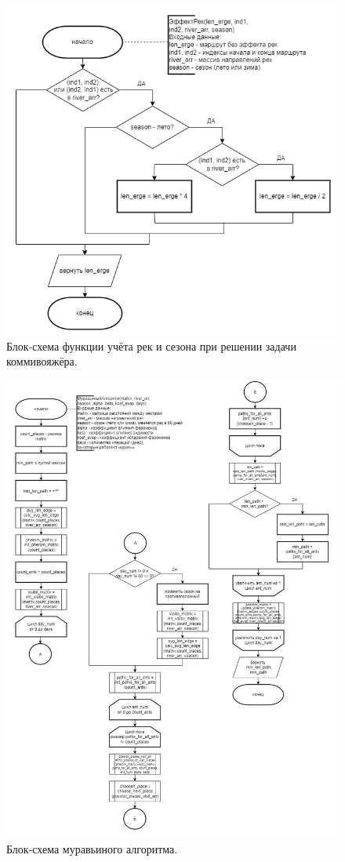\begin{figure}[H]
    \centering
    \includegraphics[width=1\textwidth]{img/block_effect_river.png}
    \caption{Блок-схема функции учёта рек и сезона при решении задачи коммивояжёра.}
    \label{fig:block_1_1}
\end{figure}

\begin{figure}[H]
    \centering
    \includegraphics[width=1.1\textwidth]{img/block_ant_algo.png}
    \caption{Блок-схема муравьиного алгоритма.}
    \label{fig:block_2}
\end{figure}

\newpage